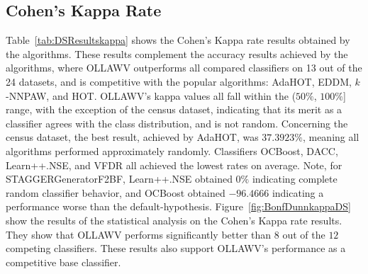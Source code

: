 \documentclass[reqno]{vcuthesis}
\numberwithin{equation}{chapter}
\begin{document}
\subsection{Cohen's Kappa Rate}
Table~\ref{tab:DSResultskappa} shows the Cohen's Kappa rate results obtained by the algorithms. These results complement the accuracy results achieved by the algorithms, where OLLAWV outperforms all compared classifiers on 13 out of the 24 datasets, and is competitive with the popular algorithms: AdaHOT, EDDM, $k$-NNPAW, and HOT. OLLAWV's kappa values all fall within the ($50\%$, $100\%$] range, with the exception of the census dataset, indicating that its merit as a classifier agrees with the class distribution, and is not random. Concerning the census dataset, the best result, achieved by AdaHOT, was $37.3923\%$, meaning all algorithms performed approximately randomly. Classifiers OCBoost, DACC, Learn++.NSE, and VFDR all achieved the lowest rates on average. Note, for STAGGERGeneratorF2BF, Learn++.NSE obtained $0\%$ indicating complete random classifier behavior, and OCBoost obtained $-96.4666$ indicating a performance worse than the default-hypothesis. Figure~\ref{fig:BonfDunnkappaDS} show the results of the statistical analysis on the Cohen's Kappa rate results. They show that OLLAWV performs significantly better than $8$ out of the $12$ competing classifiers. These results also support OLLAWV's performance as a competitive base classifier.
\end{document}
